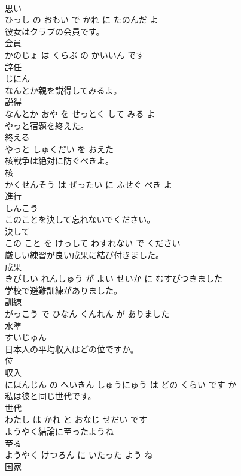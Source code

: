 \documentclass[8pt]{extreport}
\begin{document}
\begin{CJK}{UTF8}{min}
\\	思い 
\\	ひっし の おもい で かれ に たのんだ よ			
\\	彼女はクラブの会員です。	
\\	会員 
\\	かのじょ は くらぶ の かいいん です			
\\	辞任	
\\	じにん			
\\	なんとか親を説得してみるよ。	
\\	説得 
\\	なんとか おや を せっとく して みる よ			
\\	やっと宿題を終えた。	
\\	終える 
\\	やっと しゅくだい を おえた			
\\	核戦争は絶対に防ぐべきよ。	
\\	核 
\\	かくせんそう は ぜったい に ふせぐ べき よ			
\\	進行	
\\	しんこう			
\\	このことを決して忘れないでください。	
\\	決して 
\\	この こと を けっして わすれない で ください			
\\	厳しい練習が良い成果に結び付きました。	
\\	成果 
\\	きびしい れんしゅう が よい せいか に むすびつきました			
\\	学校で避難訓練がありました。	
\\	訓練 
\\	がっこう で ひなん くんれん が ありました			
\\	水準	
\\	すいじゅん			
\\	日本人の平均収入はどの位ですか。	
\\	位 
\\	収入 
\\	にほんじん の へいきん しゅうにゅう は どの くらい です か			
\\	私は彼と同じ世代です。	
\\	世代 
\\	わたし は かれ と おなじ せだい です			
\\	ようやく結論に至ったようね	
\\	至る 
\\	ようやく けつろん に いたった よう ね			
\\	国家	

\end{CJK}
\end{document}
